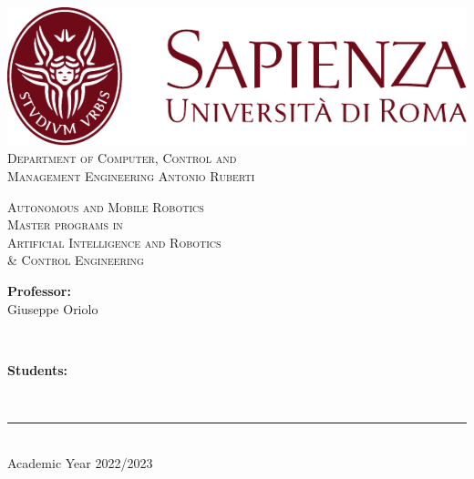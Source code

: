 \begin{titlepage}
	\centering
    \vspace*{0.5 cm}
    \includegraphics[scale = 0.75]{figures/SapienzaLogo.pdf}\\[1.0 cm]	%

    \vspace*{-0.4cm}
    \textsc{\large Department of Computer, Control and \\ Management Engineering Antonio Ruberti}\\[2.0 cm]	%
    \vspace*{1cm}

    { \fontsize{20.74pt}{18.5pt}\selectfont\bfseries \thetitle \par } %

    \vspace*{0.25cm}
    \textsc{\Large Autonomous and Mobile Robotics}\\
    \textsc{Master programs in \\Artificial Intelligence and Robotics \\\& Control Engineering}\\[0.5 cm] %
    \vspace*{2.6cm}
	\begin{minipage}{0.4\textwidth} %
		\begin{flushleft} \large
			\textbf{Professor:}\\
			Giuseppe Oriolo\\
		\end{flushleft}
	\end{minipage}~
	\begin{minipage}{0.3\textwidth} %
		\begin{flushright} \large
		\begin{minipage}{1\textwidth}
		\begin{flushleft} \large
			\textbf{Students:} \\
			\theauthor
        \end{flushleft}
        \end{minipage}
		\end{flushright}
	\end{minipage}\\[3.85 cm]

    \vspace{2cm}
    \rule{\linewidth}{0.2 mm} \\[0.3 cm]
    \vspace*{-0.2cm}
    Academic Year 2022/2023
\end{titlepage}